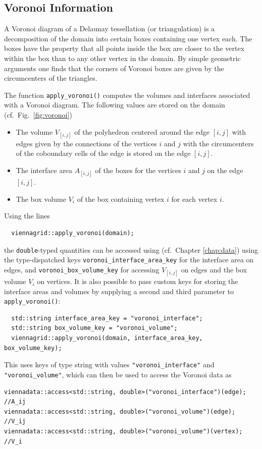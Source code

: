  \subsection{Voronoi Information}
 A Voronoi diagram of a Delaunay tessellation (or triangulation) is a decomposition of the domain into certain boxes containing one vertex each.
 The boxes have the property that all points inside the box are closer to the vertex within the box than to any other vertex in the domain. 
 By simple geometric arguments one finds that the corners of Voronoi boxes are given by the circumcenters of the triangles.

 The function \lstinline|apply_voronoi()| computes the volumes and interfaces associated with a Voronoi diagram. The following values are stored on the domain (cf.~Fig.~\ref{fig:voronoi})
 \begin{itemize}
  \item The volume $V_{[i,j]}$ of the polyhedron centered around the edge $[i,j]$ with edges given by the connections of the vertices $i$ and $j$ with the circumcenters of the coboundary cells of the edge is stored on the edge $[i,j]$.
  \item The interface area $A_{[i,j]}$ of the boxes for the vertices $i$ and $j$ on the edge $[i,j]$.
  \item The box volume $V_i$ of the box containing vertex $i$ for each vertex $i$.
 \end{itemize}
 Using the lines
 \begin{lstlisting}
  viennagrid::apply_voronoi(domain);
 \end{lstlisting}
 the \lstinline|double|-typed quantities can be accessed using {\ViennaData} (cf.~Chapter \ref{chap:data}) using the type-dispatched keys \lstinline|voronoi_interface_area_key| for the interface area on edges, and \lstinline|voronoi_box_volume_key| for accessing $V_{[i,j]}$ on edges and the box volume $V_i$ on vertices.
 It is also possible to pass custom keys for storing the interface areas and volumes by supplying a second and third parameter to \lstinline|apply_voronoi()|:
 \begin{lstlisting}
  std::string interface_area_key = "voronoi_interface";
  std::string box_volume_key = "voronoi_volume";
  viennagrid::apply_voronoi(domain, interface_area_key, box_volume_key);
 \end{lstlisting}
 This uses keys of type string with values \lstinline|"voronoi_interface"| and \lstinline|"voronoi_volume"|, which can then be used to access the Voronoi data as
 \begin{lstlisting}
viennadata::access<std::string, double>("voronoi_interface")(edge); //A_ij
viennadata::access<std::string, double>("voronoi_volume")(edge);    //V_ij
viennadata::access<std::string, double>("voronoi_volume")(vertex);  //V_i
 \end{lstlisting}



